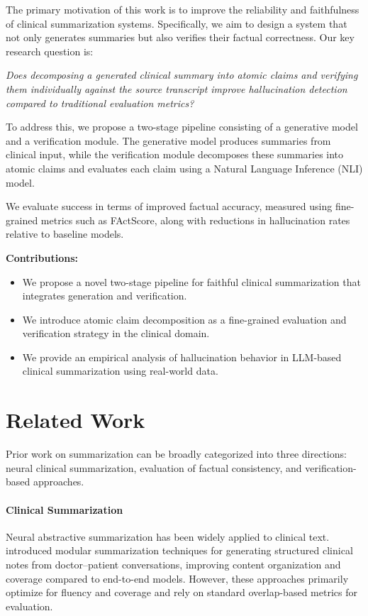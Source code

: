 \documentclass[11pt]{article}
\begin{document}
The primary motivation of this work is to improve the reliability and faithfulness of clinical summarization systems. Specifically, we aim to design a system that not only generates summaries but also verifies their factual correctness. Our key research question is:

\textit{Does decomposing a generated clinical summary into atomic claims and verifying them individually against the source transcript improve hallucination detection compared to traditional evaluation metrics?}

To address this, we propose a two-stage pipeline consisting of a generative model and a verification module. The generative model produces summaries from clinical input, while the verification module decomposes these summaries into atomic claims and evaluates each claim using a Natural Language Inference (NLI) model.

We evaluate success in terms of improved factual accuracy, measured using fine-grained metrics such as FActScore, along with reductions in hallucination rates relative to baseline models.

\textbf{Contributions:}
\begin{itemize}
    \item We propose a novel two-stage pipeline for faithful clinical summarization that integrates generation and verification.
    \item We introduce atomic claim decomposition as a fine-grained evaluation and verification strategy in the clinical domain.
    \item We provide an empirical analysis of hallucination behavior in LLM-based clinical summarization using real-world data.
\end{itemize}


\section{Related Work}

Prior work on summarization can be broadly categorized into three directions: neural clinical summarization, evaluation of factual consistency, and verification-based approaches.

\paragraph{Clinical Summarization}
Neural abstractive summarization has been widely applied to clinical text. \citet{krishna2021generating} introduced modular summarization techniques for generating structured clinical notes from doctor–patient conversations, improving content organization and coverage compared to end-to-end models. However, these approaches primarily optimize for fluency and coverage and rely on standard overlap-based metrics for evaluation.
\end{document}

